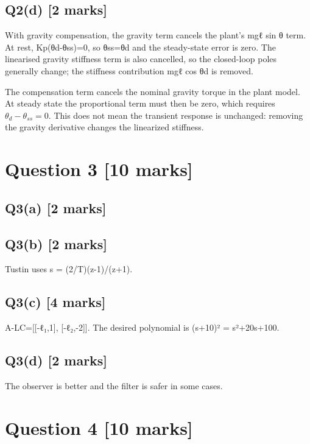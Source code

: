 \documentclass[11pt,a4paper]{article}
\begin{document}
\subsection*{Q2(d) \hfill [2 marks]}

With gravity compensation, the gravity term cancels the plant's mgℓ sin θ term.
At rest, Kp(θd-θss)=0, so θss=θd and the steady-state error is zero.
The linearised gravity stiffness term is also cancelled, so the closed-loop poles generally change; the stiffness contribution mgℓ cos θd is removed.\par\smallskip The compensation term cancels the nominal gravity torque in the plant model. At steady state the proportional term must then be zero, which requires $\theta_d-\theta_{ss}=0$. This does not mean the transient response is unchanged: removing the gravity derivative changes the linearized stiffness.

\section*{Question 3 \hfill [10 marks]}
\subsection*{Q3(a) \hfill [2 marks]}

\vspace{2mm}

\subsection*{Q3(b) \hfill [2 marks]}

Tustin uses s = (2/T)(z-1)/(z+1).

\subsection*{Q3(c) \hfill [4 marks]}

A-LC=[[-ℓ₁,1], [-ℓ₂,-2]].
The desired polynomial is (s+10)² = s²+20s+100.

\subsection*{Q3(d) \hfill [2 marks]}

The observer is better and the filter is safer in some cases.

\section*{Question 4 \hfill [10 marks]}
\end{document}

